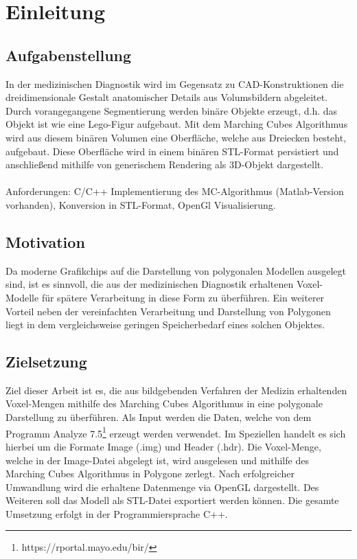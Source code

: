 \chapter{Einleitung}

\section{Aufgabenstellung}
In der medizinischen Diagnostik wird im Gegensatz zu CAD-Konstruktionen die dreidimensionale
Gestalt anatomischer Details aus Volumsbildern abgeleitet. Durch vorangegangene Segmentierung werden binäre Objekte erzeugt, d.h. das Objekt ist wie eine Lego-Figur aufgebaut. Mit dem Marching Cubes Algorithmus wird aus diesem binären Volumen eine Oberfläche, welche aus Dreiecken besteht, aufgebaut. Diese Oberfläche wird in einem binären STL-Format persistiert und anschließend mithilfe von generischem Rendering als 3D-Objekt dargestellt.\\\\
Anforderungen: C/C++ Implementierung des MC-Algorithmus (Matlab-Version vorhanden), Konversion in STL-Format, OpenGl Visualisierung.

\section{Motivation}
Da moderne Grafikchips auf die Darstellung von polygonalen Modellen ausgelegt sind, ist es sinnvoll, die aus der medizinischen Diagnostik erhaltenen Voxel-Modelle für spätere Verarbeitung in diese Form zu überführen. Ein weiterer Vorteil neben der vereinfachten Verarbeitung und Darstellung von Polygonen liegt in dem vergleichsweise geringen Speicherbedarf eines solchen Objektes.

\section{Zielsetzung}
Ziel dieser Arbeit ist es, die aus bildgebenden Verfahren der Medizin erhaltenden Voxel-Mengen mithilfe des Marching Cubes Algorithmus in eine polygonale Darstellung zu überführen. Als Input werden die Daten, welche von dem Programm Analyze 7.5\footnote{https://rportal.mayo.edu/bir/} erzeugt werden verwendet. Im Speziellen handelt es sich hierbei um die Formate Image (.img) und Header (.hdr). Die Voxel-Menge, welche in der Image-Datei abgelegt ist, wird ausgelesen und mithilfe des Marching Cubes Algorithmus in Polygone zerlegt. Nach erfolgreicher Umwandlung wird die erhaltene Datenmenge via OpenGL dargestellt. Des Weiteren soll das Modell als STL-Datei exportiert werden können. Die gesamte Umsetzung erfolgt in der Programmiersprache C++. 

